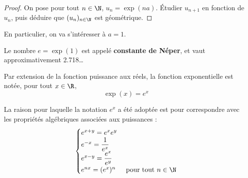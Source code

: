 \documentclass{article}
\begin{document}
\begin{proof}
On pose pour tout $n \in \N$, $u_n = \exp(na)$. Étudier $u_{n+1}$ en fonction de $u_n$, puis déduire que $(u_n)_{n \in \N}$ est géométrique.

\vspace*{0.5cm}
\emptybox{3cm}
\end{proof}
En particulier, on va s'intéresser à $a = 1$.
\begin{definition}
Le nombre $e = \exp(1)$ est appelé \textbf{constante de Néper}, et vaut approximativement \num{2,718}\dots

Par extension de la fonction puissance aux réels, la fonction exponentielle est notée, pour tout $x \in \R$,
\begin{equation*}
\exp(x) = e^x
\end{equation*}
\end{definition}
\begin{remark}
La raison pour laquelle la notation $e^x$ a été adoptée est pour correspondre avec les propriétés algébriques associées aux puissances :
\begin{equation*}
\begin{cases}
e^{x + y} = e^x e^y\\
e^{-x} = \dfrac{1}{e^x}\\
e^{x - y} = \dfrac{e^x}{e^y}\\
e^{nx} = (e^x)^n & \text{ pour tout } n \in \N 
\end{cases}
\end{equation*}
\end{remark}
\newpage
\end{document}
